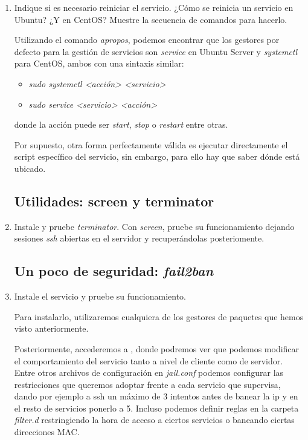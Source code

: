 \documentclass[paper=a4, fontsize=11pt]{scrartcl} %
\numberwithin{equation}{section} %
\numberwithin{figure}{section} %
\numberwithin{table}{section} %
\begin{document}
\begin{enumerate}
		\item Indique si es necesario reiniciar el servicio. ¿Cómo se reinicia un servicio en Ubuntu?
		¿Y en CentOS? Muestre la secuencia de comandos para hacerlo.
		
		Utilizando el comando \textit{apropos}\cite{man_apropos}, podemos encontrar que los gestores
		por defecto para la gestión de servicios son \textit{service}\cite{man_service} en Ubuntu Server
		y \textit{systemctl}\cite{man_systemctl} para CentOS, ambos con una sintaxis similar:
		
		\begin{itemize}
			\item \textit{sudo systemctl <acción> <servicio>}
			\item \textit{sudo service <servicio> <acción>}
		\end{itemize}
		donde la acción puede ser \textit{start}, \textit{stop} o \textit{restart} entre otras.
		
		Por supuesto, otra forma perfectamente válida es ejecutar directamente el script específico del
		servicio, sin embargo, para ello hay que saber dónde está ubicado.
		
	
	\subsection{Utilidades: screen y terminator}
		\item Instale y pruebe \textit{terminator}. Con \textit{screen}, pruebe su funcionamiento
		dejando sesiones \textit{ssh} abiertas en el servidor y recuperándolas posteriomente.
	
	\subsection{Un poco de seguridad: \textit{fail2ban}}
		\item Instale el servicio y pruebe su funcionamiento.
		
		Para instalarlo, utilizaremos cualquiera de los gestores de paquetes que hemos visto
		anteriormente.
		
		Posteriormente, accederemos a \cite{man_fail2ban}, donde podremos ver que podemos modificar
		el comportamiento del servicio tanto a nivel de cliente como de servidor. Entre otros archivos
		de configuración en \textit{jail.conf}\cite{man_jail.conf} podemos configurar las restricciones
		que queremos adoptar frente a cada servicio que supervisa, dando por ejemplo a ssh un máximo
		de 3 intentos antes de banear la ip y en el resto de servicios ponerlo a 5. Incluso podemos
		definir reglas en la carpeta \textit{filter.d} restringiendo la hora de acceso a ciertos
		servicios o baneando ciertas direcciones MAC.
		

\end{enumerate}
\end{document}
